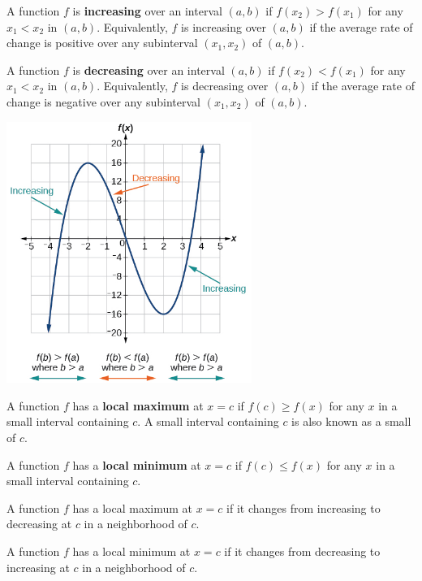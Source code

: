 \begin{definition}
  A function $f$ is \textbf{increasing} over an interval $(a, b)$ if $f(x_2)>f(x_1)$ for any $x_1<x_2$ in $(a, b)$. Equivalently, $f$ is increasing over $(a, b)$ if  the average rate of change is positive over any subinterval $(x_1, x_2)$ of $(a, b)$.
  
  A function $f$ is \textbf{decreasing} over an interval $(a, b)$ if $f(x_2)<f(x_1)$ for any $x_1<x_2$ in $(a, b)$. Equivalently, $f$ is decreasing over $(a, b)$ if  the average rate of change is negative over any subinterval $(x_1, x_2)$ of $(a, b)$.

  \begin{center}
    \includegraphics[width=0.6\textwidth]{figs/CNX_Precalc_Figure_01_03_004.jpg}
  \end{center}
\end{definition}

\newpage

\begin{definition}
  A function \(f\) has a \textbf{local maximum} at \(x=c\) if $f(c)\ge f(x)$ for any $x$ in a small interval containing $c$. A small interval containing $c$ is also known as a small  of $c$.

  A function \(f\) has a \textbf{local minimum} at \(x=c\) if $f(c)\le f(x)$ for any $x$ in a small interval containing $c$.
\end{definition}

\begin{howto}
  A function $f$ has a local maximum at $x=c$ if it changes from increasing to decreasing at $c$ in a neighborhood of $c$.
  
  A function $f$ has a local minimum at $x=c$ if it changes from decreasing to increasing at $c$ in a neighborhood of $c$.
\end{howto}



